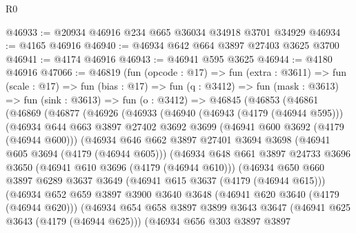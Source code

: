 \begin{lexlean}{R0}
\begin{coremodule}
@46933 := @20934 @46916 @234 @665 @36034 @34918 @3701 @34929
@46934 := @4165 @46916
@46940 := @46934 @642 @664 @3897 @27403 @3625 @3700
@46941 := @4174 @46916
@46943 := @46941 @595 @3625
@46944 := @4180 @46916
@47066 := @46819
    (fun (opcode : @17) =>
    fun (extra : @3611) =>
    fun (scale : @17) =>
    fun (bias : @17) =>
    fun (q : @3412) =>
    fun (mask : @3613) =>
    fun (sink : @3613) =>
    fun (o : @3412) =>
    @46845
      (@46853
        (@46861
          (@46869
            (@46877
              (@46926
                (@46933
                  (@46940
                    (@46943 (@4179 (@46944 @595)))
                    (@46934
                      @644
                      @663
                      @3897
                      @27402
                      @3692
                      @3699
                      (@46941 @600 @3692 (@4179 (@46944 @600)))
                      (@46934
                        @646
                        @662
                        @3897
                        @27401
                        @3694
                        @3698
                        (@46941 @605 @3694 (@4179 (@46944 @605)))
                        (@46934
                          @648
                          @661
                          @3897
                          @24733
                          @3696
                          @3650
                          (@46941 @610 @3696 (@4179 (@46944 @610)))
                          (@46934
                            @650
                            @660
                            @3897
                            @6289
                            @3637
                            @3649
                            (@46941 @615 @3637 (@4179 (@46944 @615)))
                            (@46934
                              @652
                              @659
                              @3897
                              @3900
                              @3640
                              @3648
                              (@46941 @620 @3640 (@4179 (@46944 @620)))
                              (@46934
                                @654
                                @658
                                @3897
                                @3899
                                @3643
                                @3647
                                (@46941 @625 @3643 (@4179 (@46944 @625)))
                                (@46934
                                  @656
                                  @303
                                  @3897
                                  @3897

\end{coremodule}
\end{lexlean}
